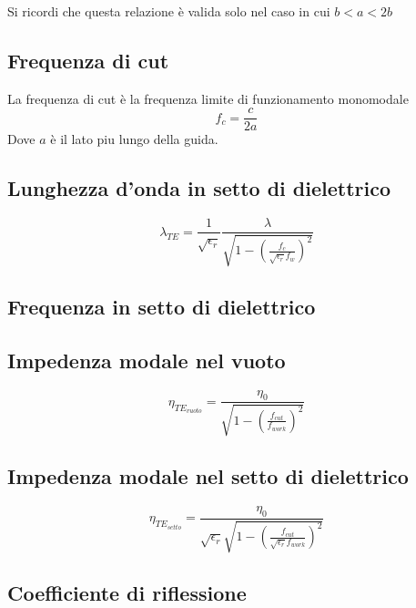 \documentclass[10pt,a4paper]{report}
\begin{document}
				Si ricordi che questa relazione è valida solo nel caso in cui $b<a<2b$

		\subsection{Frequenza di cut}
	
				La frequenza di cut è la frequenza limite di funzionamento monomodale
				\begin{equation}
				f_c=\frac{c}{2a}
				\end{equation}
				Dove $a$ è il lato piu lungo della guida.

		\subsection{Lunghezza d'onda in setto di dielettrico}

			\begin{equation}
			\lambda_{TE}=\frac{1}{\sqrt{\epsilon_r}}\frac{\lambda}{\sqrt{1- (\frac{f_c}{\sqrt{\epsilon_r}f_w})^2}}
			\end{equation}
			

		\subsection{Frequenza in setto di dielettrico}




		\subsection{Impedenza modale nel vuoto}

				\begin{equation}
				\eta_{TE_{vuoto}}=\frac{\eta_0}{ \sqrt{ 1- ( \frac {f_{cut}} {f_{work}} )^2 } }
				\end{equation}
		\subsection{Impedenza modale nel setto di dielettrico}

				\begin{equation}
				\eta_{TE_{setto}}=\frac{\eta_0}{\sqrt{\epsilon_r} \sqrt{ 1- ( \frac {f_{cut}} {\sqrt{\epsilon_r} f_{work}} )^2 } }
				\end{equation}

		\subsection{Coefficiente di riflessione}
\end{document}
